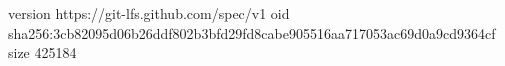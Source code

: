 version https://git-lfs.github.com/spec/v1
oid sha256:3cb82095d06b26ddf802b3bfd29fd8cabe905516aa717053ac69d0a9cd9364cf
size 425184
